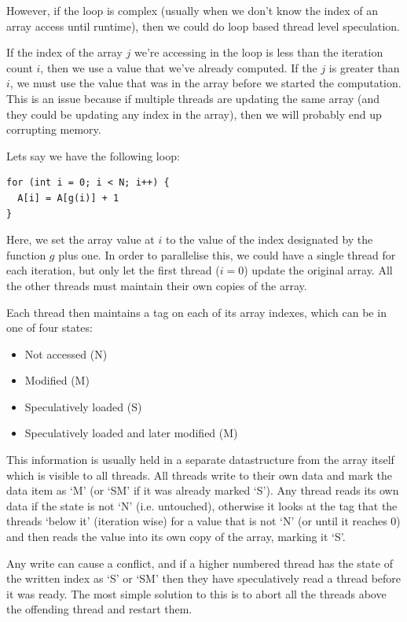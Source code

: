 However, if the loop is complex (usually when we don't know the index
of an array access until runtime), then we could do loop based thread
level speculation.

If the index of the array $j$ we're accessing in the loop is less than
the iteration count $i$, then we use a value that we've already
computed. If the $j$ is greater than $i$, we must use the value that
was in the array before we started the computation. This is an issue
because if multiple threads are updating the same array (and they
could be updating any index in the array), then we will probably end
up corrupting memory.

Lets say we have the following loop:

\begin{verbatim}
for (int i = 0; i < N; i++) {
  A[i] = A[g(i)] + 1
}
\end{verbatim}

Here, we set the array value at $i$ to the value of the index
designated by the function $g$ plus one. In order to parallelise this,
we could have a single thread for each iteration, but only let the
first thread ($i=0$) update the original array. All the other threads
must maintain their own copies of the array.

Each thread then maintains a tag on each of its array indexes, which
can be in one of four states:

\begin{itemize}
\item Not accessed (N)
\item Modified (M)
\item Speculatively loaded (S)
\item Speculatively loaded and later modified (M)
\end{itemize}

This information is usually held in a separate datastructure from the
array itself which is visible to all threads. All threads write to
their own data and mark the data item as `M' (or `SM' if it was
already marked `S'). Any thread reads its own data if the state is not
`N' (i.e. untouched), otherwise it looks at the tag that the threads
`below it' (iteration wise) for a value that is not `N' (or until it
reaches 0) and then reads the value into its own copy of the array,
marking it `S'.

Any write can cause a conflict, and if a higher numbered thread has
the state of the written index as `S' or `SM' then they have
speculatively read a thread before it was ready. The most simple
solution to this is to abort all the threads above the offending
thread and restart them.

